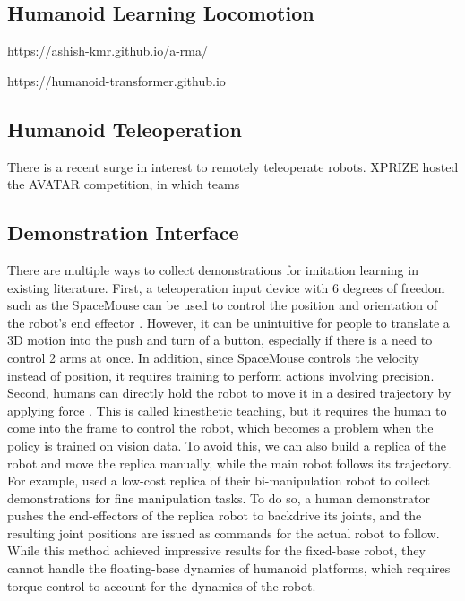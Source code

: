 \cite{arunachalam2022holodex}

\subsection{Humanoid Learning Locomotion}

\cite{}

https://ashish-kmr.github.io/a-rma/

https://humanoid-transformer.github.io

\subsection{Humanoid Teleoperation}

There is a recent surge in interest to remotely teleoperate robots. 
XPRIZE hosted the AVATAR competition, in which teams 



\subsection{Demonstration Interface}

There are multiple ways to collect demonstrations for imitation learning in existing literature. First, a teleoperation input device with 6 degrees of freedom such as the SpaceMouse can be used to control the position and orientation of the robot's end effector \cite{zhu2022robosuite}. However, it can be unintuitive for people to translate a 3D motion into the push and turn of a button, especially if there is a need to control 2 arms at once. In addition, since SpaceMouse controls the velocity instead of position, it requires training to perform actions involving precision. 
Second, humans can directly hold the robot to move it in a desired trajectory by applying force \cite{Akgn2012KeyframebasedLF} \cite{Schulman2013LearningFD}. This is called kinesthetic teaching, but it requires the human to come into the frame to control the robot, which becomes a problem when the policy is trained on vision data. To avoid this, we can also build a replica of the robot and move the replica manually, while the main robot follows its trajectory. For example, \cite{aloha} used a low-cost replica of their bi-manipulation robot to collect demonstrations for fine manipulation tasks. To do so, a human demonstrator pushes the end-effectors of the replica robot to backdrive its joints, and the resulting joint positions are issued as commands for the actual robot to follow. While this method achieved impressive results for the fixed-base robot, they cannot handle the floating-base dynamics of humanoid platforms, which requires torque control to account for the dynamics of the robot. 

